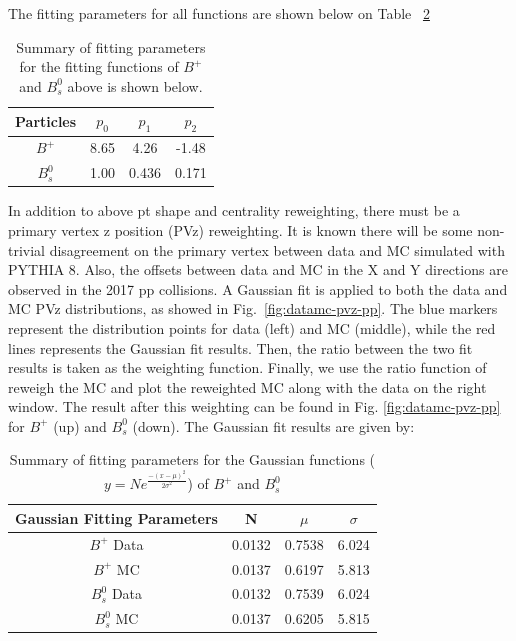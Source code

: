 The fitting parameters for all functions are shown below on Table~ \ref{fig:BptReweighTable}



\begin{table}[h]
\begin{center}
\caption{Summary of fitting parameters for the fitting functions of $B^+$ and $B^0_s$ above is shown below.}
\vspace{1em}
\label{fig:BptReweighTable}
\begin{tabular}{| c | c | c | c| }
\hline
Particles & $p_0$ & $p_1$ & $p_2$  \\
\hline
$B^{+}$ &  8.65  &  4.26 & -1.48  \\
$B^0_s$  &  1.00 & 0.436 & 0.171    \\
\hline
\end{tabular}
\end{center}
\end{table}

\clearpage




In addition to above pt shape and centrality reweighting, there must be a primary vertex z position (PVz) reweighting.
It is known there will be some non-trivial disagreement on the primary vertex between data and MC simulated with PYTHIA 8. Also, the offsets between data and MC in the X and Y directions are observed in the 2017 pp collisions. A Gaussian fit is applied to both the data and MC PVz distributions, as showed in Fig.~\ref{fig:datamc-pvz-pp}. The blue markers represent the distribution points for data (left) and MC (middle), while the red lines represents the Gaussian fit results.  Then, the ratio between the two fit results is taken as the weighting function. Finally, we use the ratio function of reweigh the MC and plot the reweighted MC along with the data on the right window. 
The result after this weighting can be found in Fig. \ref{fig:datamc-pvz-pp} for $B^+$ (up) and $B^0_s$ (down). The Gaussian fit results are given by:

\begin{table}[h]
\begin{center}
	\caption{Summary of fitting parameters for the Gaussian functions ($y = N e^{\frac{-(x-\mu)^2}{2 \sigma^2}}$) of $B^+$ and $B^0_s$ }
\vspace{1em}
\label{fig:BptReweighTable}
\begin{tabular}{| c | c | c | c| }
\hline
	Gaussian Fitting Parameters & N & $\mu$ & $\sigma$ \\
\hline
$B^+$ Data & 0.0132  &  0.7538 & 6.024 \\
$B^+$ MC &  0.0137 & 0.6197 & 5.813 \\
$B^0_s$ Data &  0.0132 & 0.7539 & 6.024  \\
$B^0_s$ MC &  0.0137 & 0.6205 & 5.815    \\
\hline
\end{tabular}
\end{center}
\end{table}



